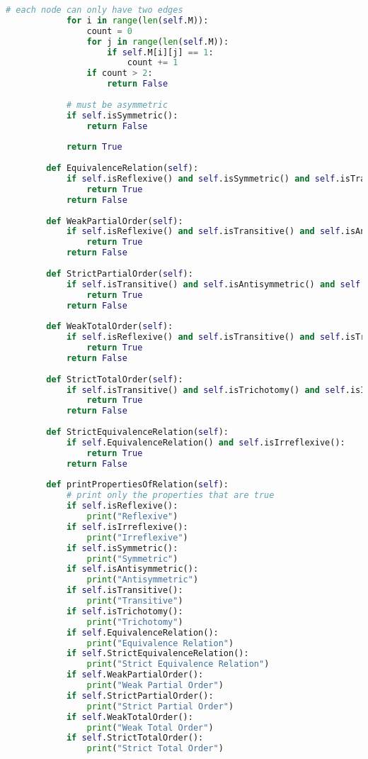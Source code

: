 \begin{lstlisting}[language=Python]
            # each node can only have two edges
            for i in range(len(self.M)):
                count = 0
                for j in range(len(self.M)):
                    if self.M[i][j] == 1:
                        count += 1
                if count > 2:
                    return False
                          
            # must be asymmetric
            if self.isSymmetric():
                return False
                
            return True
    
        def EquivalenceRelation(self):
            if self.isReflexive() and self.isSymmetric() and self.isTransitive():
                return True
            return False
    
        def WeakPartialOrder(self):
            if self.isReflexive() and self.isTransitive() and self.isAntisymmetric():
                return True
            return False
    
        def StrictPartialOrder(self):
            if self.isTransitive() and self.isAntisymmetric() and self.isIrreflexive():
                return True
            return False
    
        def WeakTotalOrder(self):
            if self.isReflexive() and self.isTransitive() and self.isTrichotomy():
                return True
            return False
    
        def StrictTotalOrder(self):
            if self.isTransitive() and self.isTrichotomy() and self.isIrreflexive():
                return True
            return False
    
        def StrictEquivalenceRelation(self):
            if self.EquivalenceRelation() and self.isIrreflexive():
                return True
            return False
    
        def printPropertiesOfRelation(self):
            # print only the properties that are true
            if self.isReflexive():
                print("Reflexive")
            if self.isIrreflexive():
                print("Irreflexive")
            if self.isSymmetric():
                print("Symmetric")
            if self.isAntisymmetric():
                print("Antisymmetric")
            if self.isTransitive():
                print("Transitive")
            if self.isTrichotomy():
                print("Trichotomy")
            if self.EquivalenceRelation():
                print("Equivalence Relation")
            if self.StrictEquivalenceRelation():
                print("Strict Equivalence Relation")
            if self.WeakPartialOrder():
                print("Weak Partial Order")
            if self.StrictPartialOrder():
                print("Strict Partial Order")
            if self.WeakTotalOrder():
                print("Weak Total Order")
            if self.StrictTotalOrder():
                print("Strict Total Order")
    

\end{lstlisting}
